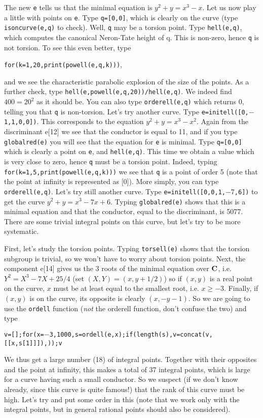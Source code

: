 The new {\tt e} tells us that the minimal equation is $y^2+y=x^3-x$.
Let us now play a little with points on {\tt e}. Type {\tt q=[0,0]}, which is
clearly on the curve (type {\tt isoncurve(e,q)} to check). Well, {\tt q} may
be a torsion point. Type {\tt hell(e,q)}, which computes the canonical
Neron-Tate height of q. This is non-zero, hence {\tt q} is not torsion. To see
this even better, type 

{\tt for(k=1,20,print(powell(e,q,k)))},

and we see the
characteristic parabolic explosion of the size of the points. As a further
check, type {\tt hell(e,powell(e,q,20))/hell(e,q)}. We indeed find $400=20^2$
as it should be. You can also type {\tt orderell(e,q)} which returns 0,
telling you that {\tt q} is non-torsion.
\smallskip
Let's try another curve. Type {\tt e=initell([0,$-$1,1,0,0])}. This corresponds
to the equation $y^2+y=x^3-x^2$. Again from the discriminant e[12] we see that
the conductor is equal to 11, and if you type {\tt globalred(e)} you will see
that the equation  for {\tt e} is minimal. Type {\tt q=[0,0]} which is clearly
a point on {\tt e}, and {\tt hell(e,q)}. This time we obtain a value which is
very close to zero, hence {\tt q} must be a torsion point. Indeed, typing
{\tt for(k=1,5,print(powell(e,q,k)))} we see that {\tt q} is a point of order
5 (note that the point at infinity is represented as [0]). More simply,
you can type {\tt orderell(e,q)}.
\smallskip
Let's try still another curve. Type {\tt e=initell([0,0,1,$-7$,6])} to get
the curve $y^2+y=x^3-7x+6$. Typing {\tt globalred(e)} shows that this is a
minimal equation and that the conductor, equal to the discriminant, is 5077.
There are some trivial integral points on this curve, but let's try to be
more systematic. 

First, let's study the torsion points. Typing {\tt torsell(e)} shows that
the torsion subgroup is trivial, so we won't have to worry about torsion
points. Next, the component e[14] gives us the 3 roots of the minimal
equation over $\Bbb C$, i.e. $Y^2=X^3-7X+25/4$ (set $(X,Y)=(x,y+1/2)$)
so if $(x,y)$ is a real point on the curve, $x$ must be at least equal to the 
smallest root, i.e. $x\ge-3$. Finally, if $(x,y)$ is on the curve, its
opposite is clearly $(x,-y-1)$. So we are going to use the {\tt ordell} 
function ({\it not} the orderell function, don't confuse the two) and type

\centerline{\tt v=[];for(x=$-$3,1000,s=ordell(e,x);if(length(s),v=concat(v,[[x,s[1]]]),));v}

We thus get a large number (18) of integral points. Together with their 
opposites and the point at infinity, this makes a total of 37 integral points,
which is large for a curve having such a small conductor. So we suspect
(if we don't know already, since this curve is quite famous!) that the rank
of this curve must be high. Let's try and put some order in this (note that
we work only with the integral points, but in general rational points should
also be considered).

